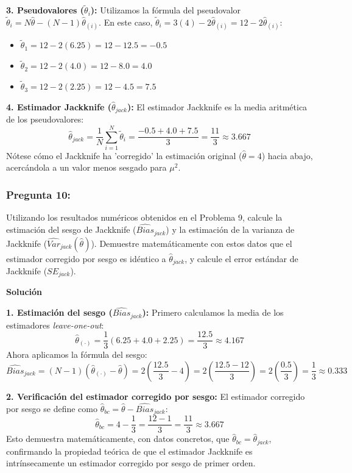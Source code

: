 \documentclass[a4paper]{article}
\begin{document}
\textbf{3. Pseudovalores ($\tilde{\theta}_i$):}
Utilizamos la fórmula del pseudovalor $\tilde{\theta}_i = N\hat{\theta} - (N-1)\hat{\theta}_{(i)}$. En este caso, $\tilde{\theta}_i = 3(4) - 2\hat{\theta}_{(i)} = 12 - 2\hat{\theta}_{(i)}$:
\begin{itemize}
    \item $\tilde{\theta}_1 = 12 - 2(6.25) = 12 - 12.5 = -0.5$
    \item $\tilde{\theta}_2 = 12 - 2(4.0) = 12 - 8.0 = 4.0$
    \item $\tilde{\theta}_3 = 12 - 2(2.25) = 12 - 4.5 = 7.5$
\end{itemize}

\textbf{4. Estimador Jackknife ($\hat{\theta}_{jack}$):}
El estimador Jackknife es la media aritmética de los pseudovalores:
$$ \hat{\theta}_{jack} = \frac{1}{N} \sum_{i=1}^N \tilde{\theta}_i = \frac{-0.5 + 4.0 + 7.5}{3} = \frac{11}{3} \approx 3.667 $$
Nótese cómo el Jackknife ha 'corregido' la estimación original ($\hat{\theta}=4$) hacia abajo, acercándola a un valor menos sesgado para $\mu^2$.

\subsubsection{Pregunta 10:} Utilizando los resultados numéricos obtenidos en el Problema 9, calcule la estimación del sesgo de Jackknife ($\widehat{Bias}_{jack}$) y la estimación de la varianza de Jackknife ($\widehat{Var}_{jack}(\hat{\theta})$). Demuestre matemáticamente con estos datos que el estimador corregido por sesgo es idéntico a $\hat{\theta}_{jack}$, y calcule el error estándar de Jackknife ($SE_{jack}$).

\textbf{Solución}

\textbf{1. Estimación del sesgo ($\widehat{Bias}_{jack}$):}
Primero calculamos la media de los estimadores \textit{leave-one-out}:
$$ \hat{\theta}_{(\cdot)} = \frac{1}{3} (6.25 + 4.0 + 2.25) = \frac{12.5}{3} \approx 4.167 $$
Ahora aplicamos la fórmula del sesgo:
$$ \widehat{Bias}_{jack} = (N-1)(\hat{\theta}_{(\cdot)} - \hat{\theta}) = 2 \left( \frac{12.5}{3} - 4 \right) = 2 \left( \frac{12.5 - 12}{3} \right) = 2 \left( \frac{0.5}{3} \right) = \frac{1}{3} \approx 0.333 $$

\textbf{2. Verificación del estimador corregido por sesgo:}
El estimador corregido por sesgo se define como $\hat{\theta}_{bc} = \hat{\theta} - \widehat{Bias}_{jack}$:
$$ \hat{\theta}_{bc} = 4 - \frac{1}{3} = \frac{12 - 1}{3} = \frac{11}{3} \approx 3.667 $$
Esto demuestra matemáticamente, con datos concretos, que $\hat{\theta}_{bc} = \hat{\theta}_{jack}$, confirmando la propiedad teórica de que el estimador Jackknife es intrínsecamente un estimador corregido por sesgo de primer orden.
\end{document}
